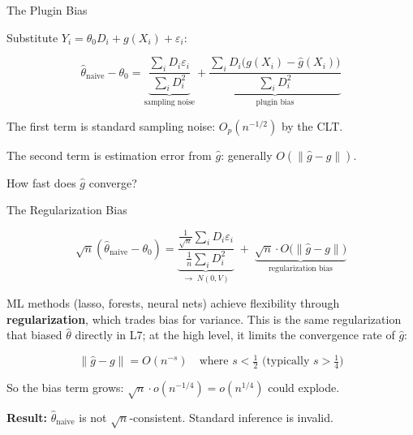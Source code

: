 \documentclass[aspectratio=169, 11pt, handout]{beamer}
\begin{document}
\begin{frame}{The Plugin Bias}

Substitute $Y_i = \theta_0 D_i + g(X_i) + \varepsilon_i$:

\[
\hat{\theta}_{\text{naive}} - \theta_0 = \underbrace{\frac{\sum_i D_i \varepsilon_i}{\sum_i D_i^2}}_{\text{sampling noise}} + \underbrace{\frac{\sum_i D_i\bigl(g(X_i) - \hat{g}(X_i)\bigr)}{\sum_i D_i^2}}_{\text{plugin bias}}
\]

\pause
\bigskip

The first term is standard sampling noise: $O_p(n^{-1/2})$ by the CLT.

\bigskip

The second term is estimation error from $\hat{g}$: generally $O(\|\hat{g} - g\|)$.

\bigskip

How fast does $\hat{g}$ converge?

\end{frame}


\begin{frame}{The Regularization Bias}

\[
\sqrt{n}(\hat{\theta}_{\text{naive}} - \theta_0) = \underbrace{\frac{\frac{1}{\sqrt{n}}\sum_i D_i \varepsilon_i}{\frac{1}{n}\sum_i D_i^2}}_{\to\; N(0, V)} \;+\; \underbrace{\sqrt{n} \cdot O\bigl(\|\hat{g} - g\|\bigr)}_{\text{regularization bias}}
\]

\pause

ML methods (lasso, forests, neural nets) achieve flexibility through \textbf{regularization}, which trades bias for variance. This is the same regularization that biased $\hat{\theta}$ directly in L7; at the high level, it limits the convergence rate of $\hat{g}$:

\[
\|\hat{g} - g\| = O(n^{-s}) \quad \text{where } s < \tfrac{1}{2} \text{ (typically } s > \tfrac{1}{4}\text{)}
\]

\pause

So the bias term grows: $\sqrt{n} \cdot o(n^{-1/4}) = o(n^{1/4})$ could explode.

\bigskip

\textbf{Result:} $\hat{\theta}_{\text{naive}}$ is not $\sqrt{n}$-consistent. Standard inference is invalid.

\end{frame}


\end{document}
